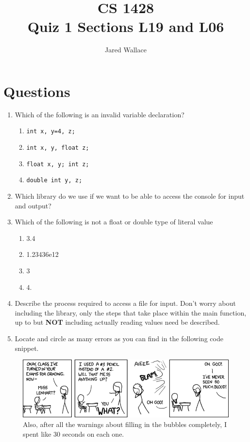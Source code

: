 \documentclass[letterpaper,12pt]{article}
\title{\Large CS 1428\\Quiz 1 Sections L19 and L06}
\author{Jared Wallace}
\date{}
\begin{document}
\maketitle

\section*{Questions}
\begin{enumerate}
	\item Which of the following is an invalid variable declaration?
		\begin{enumerate}
			\item \lstinline$int x, y=4, z;$
			\item \lstinline$int x, y, float z;$
			\item \lstinline$float x, y; int z;$
			\item \lstinline$double int y, z;$
		\end{enumerate}
	\item \nohyphens{Which library do we use if we want to be able to access the console for input and output?}
		\vspace{35mm}
	\item Which of the following is not a float or double type of literal value
		\begin{enumerate}
			\item 3.4
			\item 1.23436e12
			\item 3
			\item 4.
		\end{enumerate}
	\item \nohyphens{Describe the process required to access a file for input.  Don't worry about including the library, only the steps that take place within the main function, up to but \textbf{NOT} including actually reading values need be described.}
		\vspace{35mm}

\newpage

	\item \nohyphens{Locate and circle as many errors as you can find in the following code snippet. }
		
		\vspace{35mm}
\end{enumerate}

\vspace{20mm}

\begin{figure}[ht!]
	\centering
	\includegraphics[width=6in]{scantron.png}
	\caption*{Also, after all the warnings about filling in the bubbles completely, I spent like 30 seconds on each one.}
\end{figure}
\end{document}
